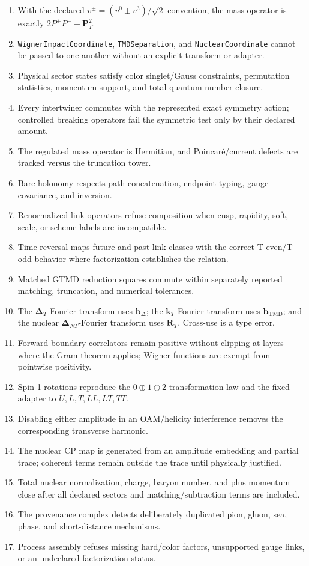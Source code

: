 \documentclass[11pt]{article}
\newcommand{\kT}{\bm{k}_{T}}
\newcommand{\DT}{\bm{\Delta}_{T}}
\newcommand{\DNT}{\bm{\Delta}_{N T}}
\newcommand{\bD}{\bm{b}_{\Delta}}
\newcommand{\bM}{\bm{b}_{\mathrm{TMD}}}
\newcommand{\RT}{\bm{R}_{T}}
\begin{document}
\begin{enumerate}
\item With the declared \(v^\pm=(v^0\pm v^3)/\sqrt2\) convention, the mass
operator is exactly \(2P^+P^- -\bm P_T^2\).
\item \texttt{WignerImpactCoordinate}, \texttt{TMDSeparation}, and
\texttt{NuclearCoordinate} cannot be passed to one another without an explicit
transform or adapter.
\item Physical sector states satisfy color singlet/Gauss constraints,
permutation statistics, momentum support, and total-quantum-number closure.
\item Every intertwiner commutes with the represented exact symmetry action;
controlled breaking operators fail the symmetric test only by their declared
amount.
\item The regulated mass operator is Hermitian, and Poincar\'e/current defects
are tracked versus the truncation tower.
\item Bare holonomy respects path concatenation, endpoint typing, gauge
covariance, and inversion.
\item Renormalized link operators refuse composition when cusp, rapidity,
soft, scale, or scheme labels are incompatible.
\item Time reversal maps future and past link classes with the correct
T-even/T-odd behavior where factorization establishes the relation.
\item Matched GTMD reduction squares commute within separately reported
matching, truncation, and numerical tolerances.
\item The \(\DT\)-Fourier transform uses \(\bD\); the \(\kT\)-Fourier
transform uses \(\bM\); and the nuclear \(\DNT\)-Fourier transform uses \(\RT\).  Cross-use is a type error.
\item Forward boundary correlators remain positive without clipping at layers
where the Gram theorem applies; Wigner functions are exempt from pointwise
positivity.
\item Spin-1 rotations reproduce the \(0\oplus1\oplus2\) transformation law
and the fixed adapter to \(U,L,T,LL,LT,TT\).
\item Disabling either amplitude in an OAM/helicity interference removes the
corresponding transverse harmonic.
\item The nuclear CP map is generated from an amplitude embedding and partial
trace; coherent terms remain outside the trace until physically justified.
\item Total nuclear normalization, charge, baryon number, and plus momentum
close after all declared sectors and matching/subtraction terms are included.
\item The provenance complex detects deliberately duplicated pion, gluon,
sea, phase, and short-distance mechanisms.
\item Process assembly refuses missing hard/color factors, unsupported gauge
links, or an undeclared factorization status.
\end{enumerate}
\end{document}
